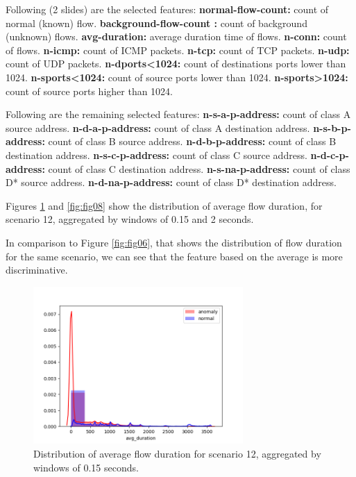 \documentclass[review]{elsarticle}
\begin{document}
Following (2 slides) are the selected features:
\textbf{normal-flow-count:} count of normal (known) flow.
\textbf{background-flow-count :} count of background (unknown) flows.
\textbf{avg-duration:} average duration time of flows.
\textbf{n-conn:} count of flows.
\textbf{n-icmp:} count of ICMP packets.
\textbf{n-tcp:} count of TCP packets.
\textbf{n-udp:} count of UDP packets.
\textbf{n-dports<1024:} count of destinations ports lower than 1024.
\textbf{n-sports<1024:} count of source ports lower than 1024.
\textbf{n-sports>1024:} count of source ports higher than 1024.

Following are the remaining selected features:
\textbf{n-s-a-p-address:} count of class A source address.
\textbf{n-d-a-p-address:} count of class A destination address.
\textbf{n-s-b-p-address:} count of class B source address.
\textbf{n-d-b-p-address:} count of class B destination address.
\textbf{n-s-c-p-address:} count of class C source address.
\textbf{n-d-c-p-address:} count of class C destination address.
\textbf{n-s-na-p-address:} count of class D* source address.
\textbf{n-d-na-p-address:} count of class D* destination address.

Figures \ref{fig:fig07} and \ref{fig:fig08} show the distribution of average flow duration, for scenario 12, aggregated by windows of 0.15 and 2 seconds.

In comparison to Figure \ref{fig:fig06}, that shows the distribution of flow duration for the same scenario, we can see that the feature based on the average is more discriminative.

\begin{figure}[h!]
     \centering
     \includegraphics[width=8cm]{figures/agg_distplot_0_15s_12_avg_duration.png}
     \caption{Distribution of average flow duration for scenario 12, aggregated by windows of 0.15 seconds.}
     \label{fig:fig07}
\end{figure}
\end{document}
